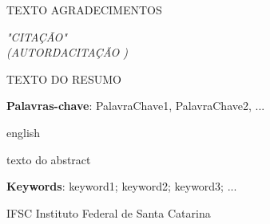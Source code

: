 \documentclass[oneside,12pt]{abntex2}
\begin{document}

\begin{agradecimentos}

	TEXTO AGRADECIMENTOS

\end{agradecimentos}



\begin{epigrafe}
	\vspace*{\fill}
	\begin{flushright}
		\textit{"CITAÇÃO"\\
		(AUTORDACITAÇÃO )}
	\end{flushright}
\end{epigrafe}



\begin{resumo}

TEXTO DO RESUMO

\vspace{\onelineskip}
\noindent
\textbf{Palavras-chave}: PalavraChave1, PalavraChave2, ...
\end{resumo}



\begin{resumo}[Abstract]
	\begin{otherlanguage*}{english}
	
		texto do abstract
		
		\vspace{\onelineskip}
		\noindent
		\textbf{Keywords}: keyword1; keyword2; keyword3; ...
	\end{otherlanguage*}
\end{resumo}



\begin{siglas}

	\item[IFSC] Instituto Federal de Santa Catarina
	
\end{siglas}
\end{document}
